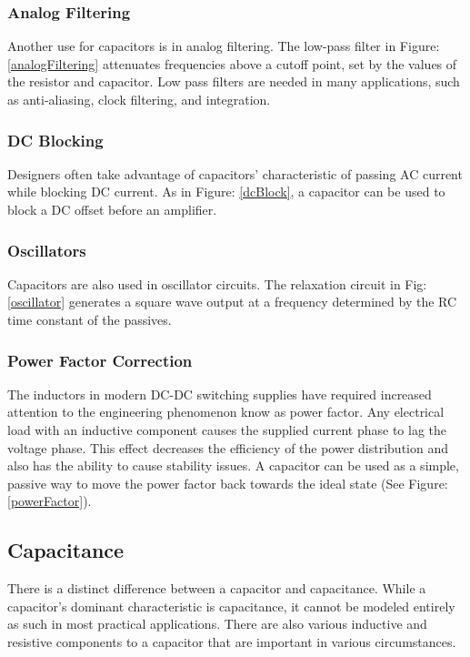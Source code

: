 \subsubsection{Analog Filtering}

Another use for capacitors is in analog filtering. The low-pass filter in Figure: \ref{analogFiltering} attenuates frequencies above a cutoff point, set by the values of the resistor and capacitor. Low pass filters are needed in many applications, such as anti-aliasing, clock filtering, and integration.


\subsubsection{DC Blocking}

Designers often take advantage of capacitors' characteristic of passing AC current while blocking DC current. As in Figure: \ref{dcBlock}, a capacitor can be used to block a DC offset before an amplifier. 


\subsubsection{Oscillators}

Capacitors are also used in oscillator circuits. The relaxation circuit in Fig: \ref{oscillator} generates a square wave output at a frequency determined by the RC time constant of the passives.


\subsubsection{Power Factor Correction}


The inductors in modern DC-DC switching supplies have required increased attention to the engineering phenomenon know as power factor. Any electrical load with an inductive component causes the supplied current phase to lag the voltage phase. This effect decreases the efficiency of the power distribution and also has the ability to cause stability issues. A capacitor can be used as a simple, passive way to move the power factor back towards the ideal state (See Figure: \ref{powerFactor}). \cite{cui_powerFactor}


\subsection{Capacitance}

There is a distinct difference between a capacitor and capacitance. While a capacitor's dominant characteristic is capacitance, it cannot be modeled entirely as such in most practical applications. There are also various inductive and resistive components to a capacitor that are important in various circumstances.

